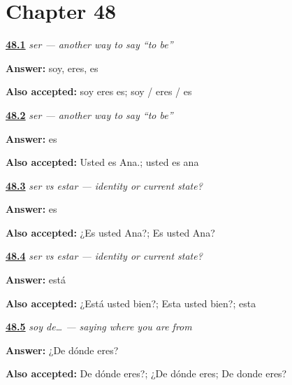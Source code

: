 \section*{Chapter 48}

\noindent\begin{minipage}[t]{\linewidth}
\raggedright
\hyperlink{review-ES-C09-ser-singular-forms}{\textbf{48.1}} \emph{ser — another way to say “to be”}\par
\small \textbf{Answer:} soy, eres, es\par
\footnotesize \textbf{Also accepted:} soy eres es; soy / eres / es
\end{minipage}\par\medskip

\noindent\begin{minipage}[t]{\linewidth}
\raggedright
\hyperlink{review-ES-C09-ser-identity}{\textbf{48.2}} \emph{ser — another way to say “to be”}\par
\small \textbf{Answer:} es\par
\footnotesize \textbf{Also accepted:} Usted es Ana.; usted es ana
\end{minipage}\par\medskip

\noindent\begin{minipage}[t]{\linewidth}
\raggedright
\hyperlink{review-ES-C09-ser-vs-estar-identify}{\textbf{48.3}} \emph{ser vs estar — identity or current state?}\par
\small \textbf{Answer:} es\par
\footnotesize \textbf{Also accepted:} ¿Es usted Ana?; Es usted Ana?
\end{minipage}\par\medskip

\noindent\begin{minipage}[t]{\linewidth}
\raggedright
\hyperlink{review-ES-C09-ser-vs-estar-state}{\textbf{48.4}} \emph{ser vs estar — identity or current state?}\par
\small \textbf{Answer:} está\par
\footnotesize \textbf{Also accepted:} ¿Está usted bien?; Esta usted bien?; esta
\end{minipage}\par\medskip

\noindent\begin{minipage}[t]{\linewidth}
\raggedright
\hyperlink{review-ES-C09-soy-de-ask-origin}{\textbf{48.5}} \emph{soy de… — saying where you are from}\par
\small \textbf{Answer:} ¿De dónde eres?\par
\footnotesize \textbf{Also accepted:} De dónde eres?; ¿De dónde eres; De donde eres?
\end{minipage}\par\medskip


